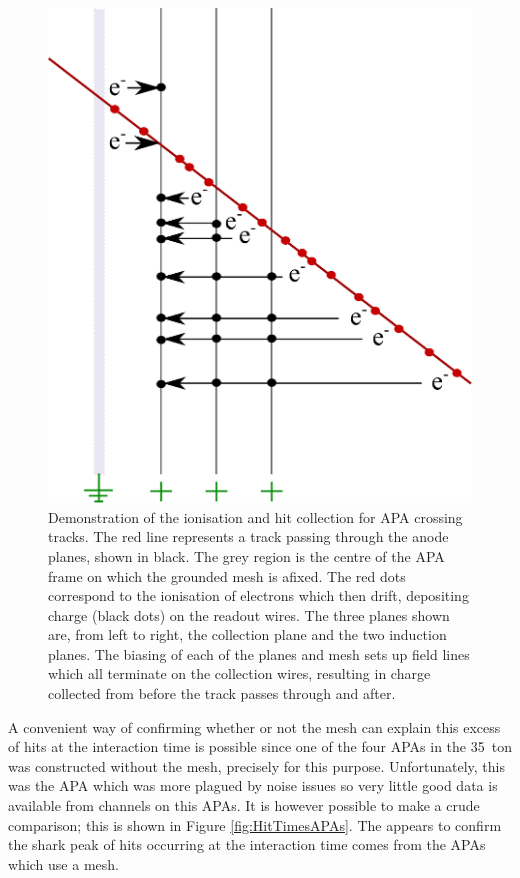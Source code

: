 \begin{figure}[p]
  \centering
  \includegraphics[width=12cm]{MeshHits.eps}
  \caption[Demonstration of the electron ionisation and hit collection for APA crossing tracks.]{Demonstration of the ionisation and hit collection for APA crossing tracks.  The red line represents a track passing through the anode planes, shown in black.  The grey region is the centre of the APA frame on which the grounded mesh is afixed.  The red dots correspond to the ionisation of electrons which then drift, depositing charge (black dots) on the readout wires.  The three planes shown are, from left to right, the collection plane and the two induction planes.  The biasing of each of the planes and mesh sets up field lines which all terminate on the collection wires, resulting in charge collected from before the track passes through and after.}
  \label{fig:MeshHits}
\end{figure}

A convenient way of confirming whether or not the mesh can explain this excess of hits at the interaction time is possible since one of the four APAs in the 35~ton was constructed without the mesh, precisely for this purpose.  Unfortunately, this was the APA which was more plagued by noise issues so very little good data is available from channels on this APAs.  It is however possible to make a crude comparison; this is shown in Figure \ref{fig:HitTimesAPAs}.  The appears to confirm the shark peak of hits occurring at the interaction time comes from the APAs which use a mesh.

